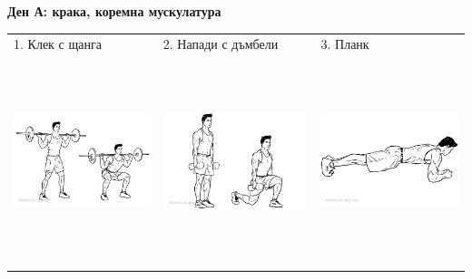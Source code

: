 \documentclass{article}
\begin{document}
\centering
\textbf{Ден А: крака, коремна мускулатура}\\
\begin{tabular}{ | m{5cm} | m{5cm} | m{5cm} | }
\hline
1. Клек с щанга & 2. Напади с дъмбели & 3. Планк \\ 
\begin{minipage}{5cm} \includegraphics[width=\linewidth, height=60mm]{Barbell-Squat.png}\end{minipage}&
\begin{minipage}{5cm} \includegraphics[width=\linewidth, height=60mm]{Dumbbell_Lunges.png} \end{minipage}& 
\begin{minipage}{5cm} \includegraphics[width=\linewidth, height=60mm]{front-plank.png} \end{minipage}\\ 

\end{tabular}
\end{document}
